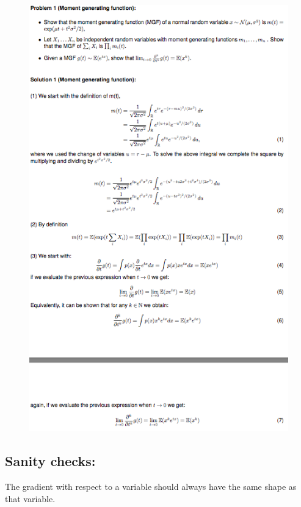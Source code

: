 \begin{figure}[H]
        \includegraphics[width=\columnwidth]{images/ex11p1.png}
        
        \label{fig:my_labelf}
    \end{figure}

\subsection{Sanity checks:}
The gradient with respect to a variable should always have the same shape as that variable.


